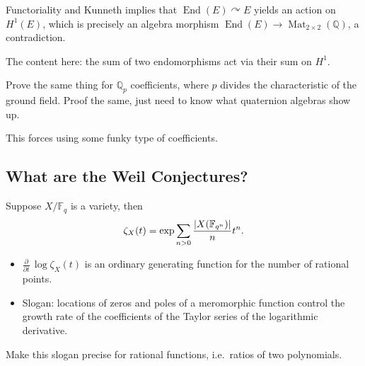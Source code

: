 \begin{exercise}

Functoriality and Kunneth implies that
\(\operatorname{End}(E)\curvearrowright E\) yields an action on
\(H^1(E)\), which is precisely an algebra morphism
\(\operatorname{End}(E) \to \operatorname{Mat}_{2\times 2}({\mathbb{Q}})\),
a contradiction.

The content here: the sum of two endomorphisms act via their sum on
\(H^1\).

\end{exercise}

\begin{exercise}

Prove the same thing for \({\mathbb{Q}}_p\) coefficients, where \(p\)
divides the characteristic of the ground field. Proof the same, just
need to know what quaternion algebras show up.

\end{exercise}

This forces using some funky type of coefficients.

\hypertarget{what-are-the-weil-conjectures}{%
\subsection{What are the Weil
Conjectures?}\label{what-are-the-weil-conjectures}}

Suppose \(X/{\mathbb{F}}_q\) is a variety, then
\begin{align*}  
\zeta_X(t) = \exp{\sum_{n>0} { {{\left\lvert {X({\mathbb{F}}_{q^n})} \right\rvert} \over n} t^n } }
.\end{align*}

\begin{remark}

\envlist

\begin{itemize}
\item
  \({\frac{\partial }{\partial t}\,} \log \zeta_X(t)\) is an ordinary
  generating function for the number of rational points.
\item
  Slogan: locations of zeros and poles of a meromorphic function control
  the growth rate of the coefficients of the Taylor series of the
  logarithmic derivative.
\end{itemize}

\end{remark}

\begin{exercise}

Make this slogan precise for rational functions, i.e.~ratios of two
polynomials.

\end{exercise}

